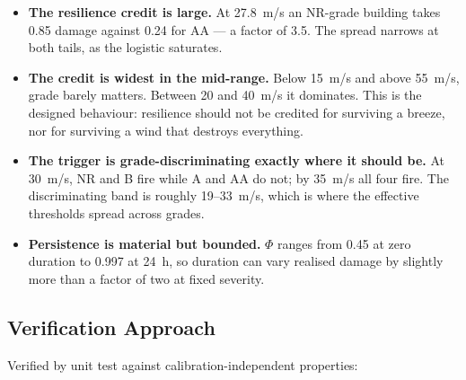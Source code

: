 \documentclass[11pt,a4paper]{article}
\begin{document}
\begin{itemize}
  \item \textbf{The resilience credit is large.} At 27.8~m/s an NR-grade
        building takes 0.85 damage against 0.24 for AA --- a factor of 3.5. The
        spread narrows at both tails, as the logistic saturates.
  \item \textbf{The credit is widest in the mid-range.} Below 15~m/s and above
        55~m/s, grade barely matters. Between 20 and 40~m/s it dominates. This
        is the designed behaviour: resilience should not be credited for
        surviving a breeze, nor for surviving a wind that destroys everything.
  \item \textbf{The trigger is grade-discriminating exactly where it should be.}
        At 30~m/s, NR and B fire while A and AA do not; by 35~m/s all four fire.
        The discriminating band is roughly 19--33~m/s, which is where the
        effective thresholds spread across grades.
  \item \textbf{Persistence is material but bounded.} $\Phi$ ranges from 0.45 at
        zero duration to 0.997 at 24~h, so duration can vary realised damage by
        slightly more than a factor of two at fixed severity.
\end{itemize}



\mkmvalidation

\subsection{Verification Approach}
Verified by unit test against calibration-independent properties:
\end{document}
